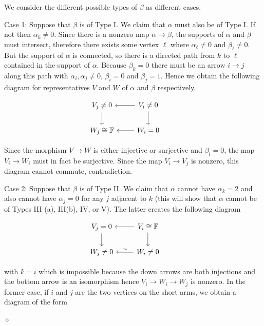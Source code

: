 \documentclass{article}
\newenvironment{proof}{\vspace*{2ex}\noindent {\em Proof:}
}{\hfill $\diamond$ \\[2ex]}
\begin{document}
\begin{proof}
We consider the different possible types of $\beta$ as different cases. 

Case 1: Suppose that $\beta$ is of Type I. We claim that $\alpha$ must also be of Type I. If not then $\alpha_k \neq 0$. Since there is a nonzero map $\alpha \to \beta$, the supports of $\alpha$ and $\beta$ must intersect, therefore there exists some vertex $\ell$ where $\alpha_\ell \neq 0$ and $\beta_\ell \neq 0$. But the support of $\alpha$ is connected, so there is a directed path from $k$ to $\ell$ contained in the support of $\alpha$. Because $\beta_k = 0$ there must be an arrow $i \to j$ along this path with $\alpha_i , \alpha_j \neq 0$, $\beta_i=0$ and $\beta_j=1$. Hence we obtain the following diagram for representatives $V$ and $W$ of $\alpha$ and $\beta$ respectively.

\begin{equation}\label{eq: first diagram}
\begin{tikzcd}
V_j \neq 0 \arrow[d]  & V_i \neq 0 \arrow[l]  \arrow[d] & 
\\ W_j \cong \mathbb{F} & W_i = 0 \arrow[l] 
\end{tikzcd}
\end{equation}

Since the morphism $V \to W$ is either injective or surjective and $\beta_i = 0$, the map $V_i \to W_i$ must in fact be surjective. Since the map $V_i \to V_j$ is nonzero, this diagram cannot commute, contradiction. 

Case 2: Suppose that $\beta$ is of Type II. We claim that $\alpha$ cannot have $\alpha_k = 2$ and also cannot have $\alpha_j = 0$ for any $j$ adjacent to $k$ (this will show that $\alpha$ cannot be of Types III (a), III(b), IV, or V). The latter creates the following diagram

\begin{equation}\label{eq: one to zero bottom iso}
\begin{tikzcd}
V_j = 0 \arrow[d]  & V_i \cong \mathbb{F} \arrow[l]  \arrow[d] & 
\\ W_j \neq 0 & W_i \neq 0 \arrow[l, "\sim" '] 
\end{tikzcd}
\end{equation}

with $k = i$ which is impossible because the down arrows are both injections and the bottom arrow is an isomorphism hence $V_i \to W_i \to W_j$ is nonzero. In the former case, if $i$ and $j$ are the two vertices on the short arms, we obtain a diagram of the form 


\end{proof}
\end{document}
